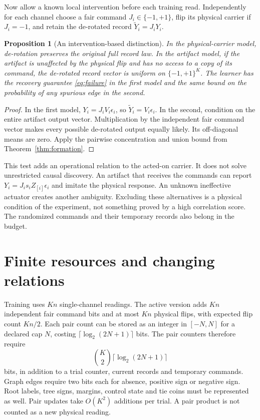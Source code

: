 \documentclass[11pt]{article}
\newtheorem{proposition}[theorem]{Proposition}
\theoremstyle{definition}
\theoremstyle{remark}
\begin{document}
Now allow a known local intervention before each training read. Independently for each channel choose a fair command $J_i\in\{-1,+1\}$, flip its physical carrier if $J_i=-1$, and retain the de-rotated record $\widetilde Y_i=J_iY_i$.

\begin{proposition}[An intervention-based distinction]
\label{prop:intervene}
In the physical-carrier model, de-rotation preserves the original full record law. In the artifact model, if the artifact is unaffected by the physical flip and has no access to a copy of its command, the de-rotated record vector is uniform on $\{-1,+1\}^K$. The learner has the recovery guarantee \eqref{eq:failure} in the first model and the same bound on the probability of any spurious edge in the second.
\end{proposition}
\begin{proof}
In the first model, $Y_i=J_iV_i\epsilon_i$, so $\widetilde Y_i=V_i\epsilon_i$. In the second, condition on the entire artifact output vector. Multiplication by the independent fair command vector makes every possible de-rotated output equally likely. Its off-diagonal means are zero. Apply the pairwise concentration and union bound from Theorem~\ref{thm:formation}.
\end{proof}

This test adds an operational relation to the acted-on carrier. It does not solve unrestricted causal discovery. An artifact that receives the commands can report $Y_i=J_is_iZ_{[i]}\epsilon_i$ and imitate the physical response. An unknown ineffective actuator creates another ambiguity. Excluding these alternatives is a physical condition of the experiment, not something proved by a high correlation score. The randomized commands and their temporary records also belong in the budget.

\section{Finite resources and changing relations}
\label{sec:budget}

Training uses $Kn$ single-channel readings. The active version adds $Kn$ independent fair command bits and at most $Kn$ physical flips, with expected flip count $Kn/2$. Each pair count can be stored as an integer in $[-N,N]$ for a declared cap $N$, costing $\lceil\log_2(2N+1)\rceil$ bits. The pair counters therefore require
\begin{equation}
 \binom K2\lceil\log_2(2N+1)\rceil
\end{equation}
bits, in addition to a trial counter, current records and temporary commands. Graph edges require two bits each for absence, positive sign or negative sign. Root labels, tree signs, margins, control state and tie coins must be represented as well. Pair updates take $O(K^2)$ additions per trial. A pair product is not counted as a new physical reading.
\end{document}
